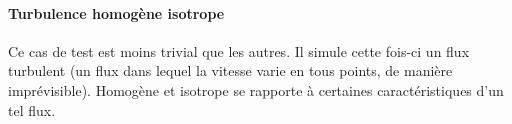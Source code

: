 \paragraph{Turbulence homogène isotrope}Ce cas de test est moins trivial que les autres. Il simule cette fois-ci un flux turbulent (un flux dans lequel la vitesse varie en tous points, de manière imprévisible). Homogène et isotrope se rapporte à certaines caractéristiques d'un tel flux. 




